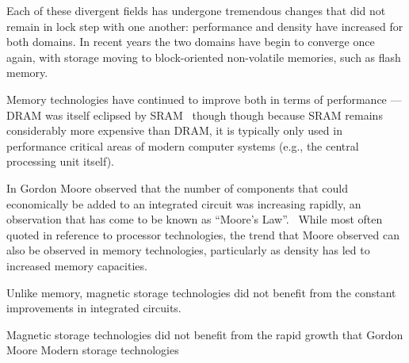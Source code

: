 Each of these divergent fields has undergone tremendous changes that did not remain
in lock step with one another: performance and density have increased for both
domains.  In recent years the two domains have begin to converge once again, with
storage moving to block-oriented non-volatile memories, such as flash 
memory.~\cite{bez2003introduction}

Memory technologies have continued to improve both in terms of performance --- \acs{DRAM}
was itself eclipsed by \acs{SRAM}~\cite{US4322675A} though though because \acs{SRAM} 
remains considerably more expensive than \acs{DRAM}, it is typically only used in performance
critical areas of modern computer systems (e.g., the central processing unit itself).

In \citeyear{moore1965cramming} Gordon Moore observed that the number of components that
could economically be added to an integrated circuit was increasing rapidly, an observation
that has come to be known as ``Moore's Law''.~\cite{moore1965cramming}  While most often quoted
in reference to processor technologies, the trend that Moore observed can also be observed
in memory technologies, particularly as density has led to increased memory capacities.

Unlike memory, magnetic storage technologies did not benefit from the constant improvements
in integrated circuits.

Magnetic storage technologies did not benefit from the rapid growth that Gordon Moore 
Modern storage technologies 


\endinput

Any text after an \endinput is ignored.
You could put scraps here or things in progress.

%

This document provides a quick set of instructions for using the
\class{ubcdiss} class to write a dissertation in \LaTeX. 
Unfortunately this document cannot provide an introduction to using
\LaTeX.  The classic reference for learning \LaTeX\ is
\citeauthor{lamport-1994-ladps}'s
book~\cite{lamport-1994-ladps}.  There are also many freely-available
tutorials online;
\webref{http://www.andy-roberts.net/misc/latex/}{Andy Roberts' online
    \LaTeX\ tutorials}
seems to be excellent.
The source code for this docment, however, is intended to serve as
an example for creating a \LaTeX\ version of your dissertation.

